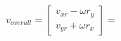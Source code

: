 \documentclass[preview]{standalone}
\begin{document}
\begin{align*}
v_{overall}= \begin{bmatrix} v_{xr}-\omega r_y\\ v_{yr}+\omega r_x\end{bmatrix}=
\end{align*}
\end{document}
